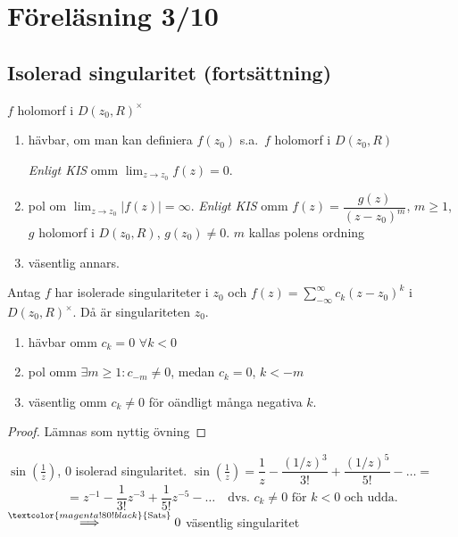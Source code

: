 \section{Föreläsning 3/10}
\subsection{Isolerad singularitet (fortsättning)}
$f$ holomorf i $D(z_0, R)^\times$
\begin{enumerate}[label=\textcolor{red!70!black}{\roman*)}]
  \item hävbar, om man kan definiera $f(z_0)$ s.a.\ $f$ holomorf i $D(z_0, R)$

  \emph{Enligt KIS} omm $\displaystyle\lim_{z \to z_0} f(z) = 0$.
  \item pol om $\displaystyle\lim_{z \to z_0} |f(z)| = \infty$. \emph{Enligt KIS} omm $f(z) = \dfrac{g(z)}{(z - z_0)^m}$, $m \ge 1$, $g$ holomorf i $D(z_0, R)$, $g(z_0) \neq 0$. $m$ kallas polens ordning
  \item väsentlig annars.
\end{enumerate}

\begin{theorem}[Sats 4.3R]
Antag $f$ har isolerade singulariteter i $z_0$ och $f(z) = \sum_{-\infty}^\infty c_k(z - z_0)^k$ i \emph{$D(z_0, R)^\times$}. Då är singulariteten $z_0$.
\begin{enumerate}[label=\textcolor{blue!60!black}{\alph*)}]
  \item hävbar omm $c_k = 0$ $\forall k < 0$
  \item pol omm $\exists m \ge 1 : c_{-m} \neq 0$, medan $c_k = 0$, $k < -m$
  \item väsentlig omm $c_k \neq 0$ för oändligt många negativa $k$.
\end{enumerate}
\end{theorem}
\begin{proof}
Lämnas som nyttig övning
\end{proof}

\begin{example}
$\sin(\frac{1}{z})$, $0$ isolerad singularitet. $\sin(\frac{1}{z}) = \dfrac{1}{z} - \dfrac{(1/z)^3}{3!} + \dfrac{(1/z)^5}{5!} - \dots =$
\[ = z^{-1} - \frac{1}{3!} z^{-3} + \frac{1}{5!} z^{-5} - \dots \quad \text{dvs.\ } c_k \neq 0 \text{ för } k < 0 \text{ och udda.} \]
$\overset{\textcolor{magenta!80!black}{\text{Sats}}}{\Longrightarrow} 0$ väsentlig singularitet
\end{example}


